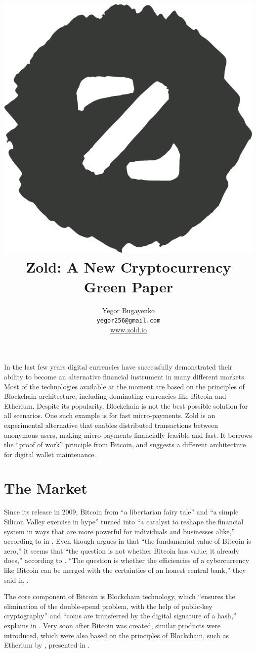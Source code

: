 \documentclass[12pt,oneside]{article}
\title{\includegraphics[scale=0.3]{../images/logo.pdf}\\Zold: A New Cryptocurrency\\\colorbox{green!30}{Green Paper}}
\author{Yegor Bugayenko\\
  \texttt{yegor256@gmail.com}\\
  \href{https://www.zold.io}{www.zold.io}\\[1em]
  \href{https://github.com/zold-io/papers/releases/tag/\zoldversion}{\texttt{\zoldversion}}}
\begin{document}
\raggedbottom

\maketitle

In the last few years digital currencies have successfully demonstrated
their ability to become an alternative financial instrument in many
different markets. Most of the technologies available at the moment are
based on the principles of Blockchain architecture, including
dominating currencies like Bitcoin and Etherium. Despite its
popularity, Blockchain is not the best possible solution for all scenarios.
One such example is for fast micro-payments.
Zold is an experimental alternative that enables distributed transactions between
anonymous users, making micro-payments financially feasible and fast.
It borrows the ``proof of work'' principle from Bitcoin,
and suggests a different architecture for digital wallet maintenance.

\pagebreak

\section*{The Market}

Since its release in 2009, Bitcoin from
``a libertarian fairy tale'' and ``a simple Silicon Valley exercise in hype''
turned into ``a catalyst to reshape the financial system in ways that are more
powerful for individuals and businesses alike,'' according to \citeauthor{andreessen2014}
in .
Even though \citeauthor{cheah2015} argues in  that
``the fundamental value of Bitcoin is zero,''
it seems that ``the question is not whether Bitcoin has value; it already does,''
according to \citeauthor{van2014}.
``The question is whether the efficiencies of a cybercurrency
like Bitcoin can be merged with the certainties of an honest central bank,''
they said in .

The core component of Bitcoin is Blockchain technology, which
``ensures the elimination of the double-spend problem, with the help
of public-key cryptography'' and ``coins are transferred by the
digital signature of a hash,''
explains \citeauthor{pilkington2016} in .
Very soon after Bitcoin was created, similar products were introduced,
which were also based on the principles of Blockchain, such as
Etherium by \citeauthor{buterin2013}, presented in .
\end{document}
